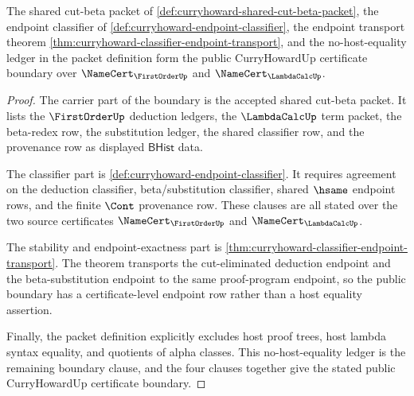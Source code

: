 \begin{theorem}\label{thm:curryhoward-public-namecert-boundary}
The shared cut-beta packet of \autoref{def:curryhoward-shared-cut-beta-packet}, the endpoint classifier of \autoref{def:curryhoward-endpoint-classifier}, the endpoint transport theorem \autoref{thm:curryhoward-classifier-endpoint-transport}, and the no-host-equality ledger in the packet definition form the public CurryHowardUp certificate boundary over $\NameCert_{\FirstOrderUp}$ and $\NameCert_{\LambdaCalcUp}$.
\end{theorem}
\begin{proof}
The carrier part of the boundary is the accepted shared cut-beta packet. It lists the $\FirstOrderUp$ deduction ledgers, the $\LambdaCalcUp$ term packet, the beta-redex row, the substitution ledger, the shared classifier row, and the provenance row as displayed $\mathsf{BHist}$ data.

The classifier part is \autoref{def:curryhoward-endpoint-classifier}. It requires agreement on the deduction classifier, beta/substitution classifier, shared $\hsame$ endpoint rows, and the finite $\Cont$ provenance row. These clauses are all stated over the two source certificates $\NameCert_{\FirstOrderUp}$ and $\NameCert_{\LambdaCalcUp}$.

The stability and endpoint-exactness part is \autoref{thm:curryhoward-classifier-endpoint-transport}. The theorem transports the cut-eliminated deduction endpoint and the beta-substitution endpoint to the same proof-program endpoint, so the public boundary has a certificate-level endpoint row rather than a host equality assertion.

Finally, the packet definition explicitly excludes host proof trees, host lambda syntax equality, and quotients of alpha classes. This no-host-equality ledger is the remaining boundary clause, and the four clauses together give the stated public CurryHowardUp certificate boundary.
\end{proof}

